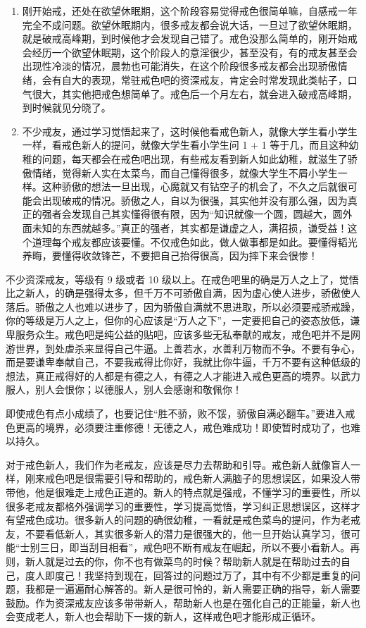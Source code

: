 \begin{enumerate}
    \item 刚开始戒，还处在欲望休眠期，这个阶段容易觉得戒色很简单嘛，自感戒一年完全不成问题。欲望休眠期内，很多戒友都会说大话，一旦过了欲望休眠期，就是破戒高峰期，到时候他才会发现自己错了。戒色没那么简单的，刚开始戒会经历一个欲望休眠期，这个阶段人的意淫很少，甚至没有，有的戒友甚至会出现性冷淡的情况，晨勃也可能消失，在这个阶段很多戒友都会出现骄傲情绪，会有自大的表现，常驻戒色吧的资深戒友，肯定会时常发现此类帖子，口气很大，其实他把戒色想简单了。戒色后一个月左右，就会进入破戒高峰期，到时候就见分晓了。
    \item 不少戒友，通过学习觉悟起来了，这时候他看戒色新人，就像大学生看小学生一样，看戒色新人的提问，就像大学生看小学生问 1 + 1 等于几，而且这种幼稚的问题，每天都会在戒色吧出现，有些戒友看到新人如此幼稚，就滋生了骄傲情绪，觉得新人实在太菜鸟，而自己懂得很多，就像大学生不屑小学生一样。这种骄傲的想法一旦出现，心魔就又有钻空子的机会了，不久之后就很可能会出现破戒的情况。骄傲之人，自以为很强，其实他并没有那么强，因为真正的强者会发现自己其实懂得很有限，因为“知识就像一个圆，圆越大，圆外面未知的东西就越多。”真正的强者，其实都是谦虚之人，满招损，谦受益！这个道理每个戒友都应该要懂。不仅戒色如此，做人做事都是如此。要懂得韬光养晦，要懂得收敛锋芒，不要把自己抬得很高，因为摔下来会很惨！
\end{enumerate}

不少资深戒友，等级有 9 级或者 10 级以上。在戒色吧里的确是万人之上了，觉悟比之新人，的确是强得太多，但千万不可骄傲自满，因为虚心使人进步，骄傲使人落后。骄傲之人也难以进步了，因为骄傲自满就不思进取，所以必须要戒骄戒躁，你的等级是万人之上，但你的心应该是“万人之下”，一定要把自己的姿态放低，谦卑服务众生。戒色吧是纯公益的贴吧，应该多些无私奉献的戒友，戒色吧并不是网游世界，到处虐杀来显得自己牛逼。上善若水，水善利万物而不争。不要有争心，而是要谦卑奉献自己，不要我戒得比你好，我就比你牛逼，千万不要有这种低级的想法，真正戒得好的人都是有德之人，有德之人才能进入戒色更高的境界。以武力服人，别人会恨你；以德服人，别人会感谢和敬佩你！

即使戒色有点小成绩了，也要记住“胜不骄，败不馁，骄傲自满必翻车。”要进入戒色更高的境界，必须要注重修德！无德之人，戒色难成功！即使暂时成功了，也难以持久。

对于戒色新人，我们作为老戒友，应该是尽力去帮助和引导。戒色新人就像盲人一样，刚来戒色吧是很需要引导和帮助的，戒色新人满脑子的思想误区，如果没人带带他，他是很难走上戒色正道的。新人的特点就是强戒，不懂学习的重要性，所以很多老戒友都格外强调学习的重要性，学习提高觉悟，学习纠正思想误区，这样才有望戒色成功。很多新人的问题的确很幼稚，一看就是戒色菜鸟的提问，作为老戒友，不要看低新人，其实很多新人的潜力是很强大的，他一旦开始认真学习，很可能“士别三日，即当刮目相看”，戒色吧不断有戒友在崛起，所以不要小看新人。再则，新人就是过去的你，你不也有做菜鸟的时候？帮助新人就是在帮助过去的自己，度人即度己！我坚持到现在，回答过的问题过万了，其中有不少都是重复的问题，我都是一遍遍耐心解答的。新人是很可怜的，新人需要正确的指导，新人需要鼓励。作为资深戒友应该多带带新人，帮助新人也是在强化自己的正能量，新人也会变成老人，新人也会帮助下一拨的新人，这样戒色吧才能形成正循环。

